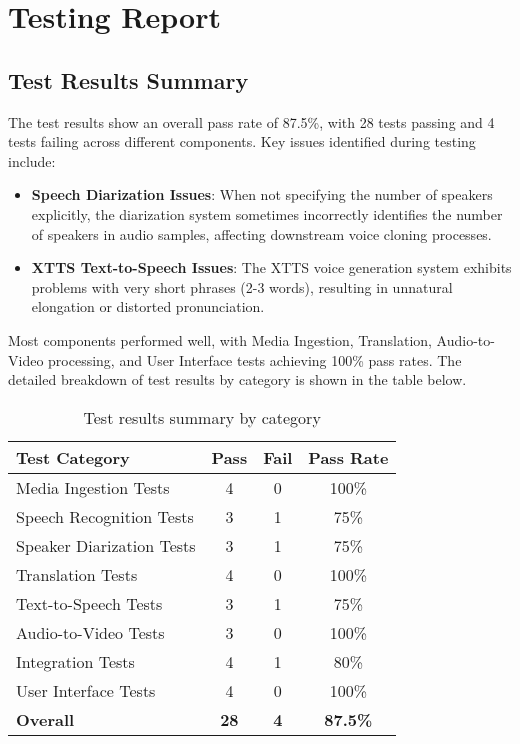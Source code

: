 \documentclass[11pt,a4paper]{article}
\begin{document}
\section{Testing Report}

\subsection{Test Results Summary}

The test results show an overall pass rate of 87.5\%, with 28 tests passing and 4 tests failing across different components. Key issues identified during testing include:

\begin{itemize}
    \item \textbf{Speech Diarization Issues}: When not specifying the number of speakers explicitly, the diarization system sometimes incorrectly identifies the number of speakers in audio samples, affecting downstream voice cloning processes.
    
    \item \textbf{XTTS Text-to-Speech Issues}: The XTTS voice generation system exhibits problems with very short phrases (2-3 words), resulting in unnatural elongation or distorted pronunciation.
\end{itemize}

Most components performed well, with Media Ingestion, Translation, Audio-to-Video processing, and User Interface tests achieving 100\% pass rates. The detailed breakdown of test results by category is shown in the table below.

\begin{table}[h]
\centering
\begin{tabular}{lccc}
\toprule
\textbf{Test Category} & \textbf{Pass} & \textbf{Fail} & \textbf{Pass Rate} \\
\midrule
Media Ingestion Tests & 4 & 0 & 100\% \\
Speech Recognition Tests & 3 & 1 & 75\% \\
Speaker Diarization Tests & 3 & 1 & 75\% \\
Translation Tests & 4 & 0 & 100\% \\
Text-to-Speech Tests & 3 & 1 & 75\% \\
Audio-to-Video Tests & 3 & 0 & 100\% \\
Integration Tests & 4 & 1 & 80\% \\
User Interface Tests & 4 & 0 & 100\% \\
\midrule
\textbf{Overall} & \textbf{28} & \textbf{4} & \textbf{87.5\%} \\
\bottomrule
\end{tabular}
\caption{Test results summary by category}
\end{table}
\end{document}
